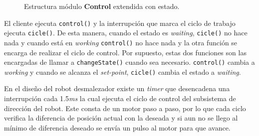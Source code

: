 \begin{figure}[h]
\caption{Estructura módulo \textbf{Control} extendida con estado.}
\begin{center}
\end{center}
\end{figure}

El cliente ejecuta \verb|control()| y la interrupción que marca el ciclo de trabajo ejecuta \verb|cicle()|. De esta manera, cuando el estado es \textit{waiting}, \verb|cicle()| no hace nada y cuando está en \textit{working} \verb|control()| no hace nada y la otra función se encarga de realizar el ciclo de control.
Por supuesto, estas dos funciones son las encargadas de llamar a \verb|changeState()| cuando sea necesario. \verb|control()| cambia a \textit{working} y cuando se alcanza el \textit{set-point}, \verb|cicle()| cambia el estado a \textit{waiting}.

En el diseño del robot desmalezador\cite{paperPomponio} existe un \textit{timer} que desencadena una interrupción cada 1.5\textit{ms} la cual ejecuta el ciclo de control del subsistema de dirección del robot. Este consta de un motor paso a paso, por lo que cada ciclo verifica la diferencia de posición actual con la deseada y si aun no se llego al mínimo de diferencia deseado se envía un pulso al motor para que avance.

